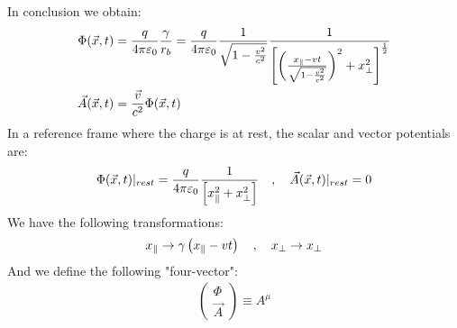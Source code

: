 In conclusion we obtain:
\begin{align*}
    \Phi(\vec{x},t) &= \frac{q}{4 \pi \varepsilon_0} \frac{\gamma}{r_b}
    = \frac{q}{4 \pi \varepsilon_0} \frac{1}{\sqrt{1 - \frac{v^2}{c^2}}}
        \frac{1}{\left[ \left( \frac{x_\parallel - v t}{\sqrt{1 - \frac{v^2}{c^2}}} \right)^2 + x_\perp^2 \right]^{\frac{1}{2}}}
    \\
    \vec{A}(\vec{x},t) &= \frac{\vec{v}}{c^2} \Phi(\vec{x},t)
\end{align*}
In a reference frame where the charge is at rest, the scalar and vector
potentials are:
\begin{align*}
    \Phi(\vec{x},t)|_{rest} = \frac{q}{4 \pi \varepsilon_0} \frac{1}{\left[ x_\parallel^2 + x_\perp^2 \right]}
    \hspace{10pt} , \hspace{10pt}
    \vec{A}(\vec{x},t)|_{rest} = 0
\end{align*}
We have the following transformations:
\begin{align*}
    x_\parallel \rightarrow \gamma \left( x_\parallel - v t \right)
    \hspace{10pt} , \hspace{10pt}
    x_\perp \rightarrow x_\perp
\end{align*}
And we define the following "four-vector":
\begin{align*}
    \begin{pmatrix}
        \Phi \\ \vec{A}
    \end{pmatrix} \equiv A^\mu
\end{align*}